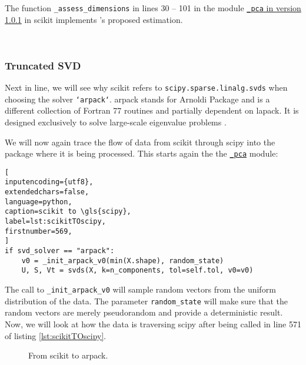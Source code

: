 \bigskip
The function \texttt{\_assess\_dimensions} in lines 30 -- 101 in the module \href{\scikitPCAvIxOxI{_pca}}{\texttt{\_pca} in version 1.0.1} in \gls{scikit} implements \citeauthor{minka2000automatic}'s proposed estimation.



\ \clearpage


\subsubsection{Truncated SVD}

Next in line, we will see why \gls{scikit} refers to \texttt{scipy.sparse.linalg.svds} when choosing the solver \texttt{`arpack`}. 
\acrshort{arpack} stands for Arnoldi Package and is a different collection of Fortran 77 routines and partially dependent on \acrshort{lapack}.
It is designed exclusively to solve large-scale eigenvalue problems \cite{lehoucq1998arpack}.
\medskip


We will now again trace the flow of data from \gls{scikit} through \gls{scipy} into the package where it is being processed.
This starts again the the \href{\scikitPCAvIxOxI{_pca}}{\texttt{\_pca}} module:

\begin{lstlisting}[
inputencoding={utf8}, 
extendedchars=false, 
language=python, 
caption=scikit to \gls{scipy}, 
label=lst:scikitTOscipy,
firstnumber=569,
]
if svd_solver == "arpack":
    v0 = _init_arpack_v0(min(X.shape), random_state)
    U, S, Vt = svds(X, k=n_components, tol=self.tol, v0=v0)
\end{lstlisting}

\noindent
The call to \texttt{\_init\_arpack\_v0} will sample random vectors from the uniform distribution of the data.
The parameter \texttt{random\_state} will make sure that the random vectors are merely pseudorandom and provide a deterministic result.
Now, we will look at how the data is traversing \gls{scipy} after being called in line 571 of listing \ref{lst:scikitTOscipy}.
\bigskip

\renewcommand{\tikzscale}{0.65}
\begin{figure}[h]
	\centering
	
	\captionsetup{justification=centering}
	\vspace*{5mm}
	\caption{From scikit to \acrshort{arpack}.}
	\label{fig:scikitToARPACK}
\end{figure}
\bigskip



